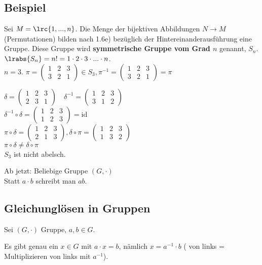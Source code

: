 	\subsection{Beispiel}

	Sei $M=\lrc{1,...,n}$. Die Menge der bijektiven Abbildungen $N\rightarrow M$ (Permutationen) bilden nach 1.6e) bezüglich der Hintereinanderausführung eine Gruppe. Diese Gruppe wird \textbf{symmetrische Gruppe vom Grad $n$} genannt, $S_n$.\\
	$\lrabs{S_n}=n!=1\cdot 2\cdot 3\cdot...\cdot n$.\\
	$n=3$. $\pi=\begin{pmatrix}1&2&3\\3&2&1\end{pmatrix}\in S_3,\pi^{-1}=\begin{pmatrix}1&2&3\\3&2&1\end{pmatrix}=\pi$

	$\delta=\begin{pmatrix}1&2&3\\2&3&1\end{pmatrix}
	\quad\delta^{-1}=
	\begin{pmatrix}1&2&3\\3&1&2\end{pmatrix}$\\
	$\delta^{-1}\circ\delta=
\begin{pmatrix}1&2&3\\1&2&3\end{pmatrix}=\mbox{id}$\\
	$\pi\circ\delta=\begin{pmatrix}1&2&3\\2&1&3\end{pmatrix},\delta\circ\pi=\begin{pmatrix}1&2&3\\1&3&2\end{pmatrix}$\\
	$\pi\circ\delta\neq\delta\circ\pi$\\
	$S_3$ ist nicht abelsch.

	Ab jetzt: Beliebige Gruppe $(G,\cdot)$\\
	Statt $a\cdot b$ schreibt man $ab$.

	\subsection{Gleichunglösen in Gruppen}

	Sei $(G,\cdot)$ Gruppe, $a,b\in G$.
		\item Es gibt genau ein $x\in G$ mit $a\cdot x=b$, nämlich $x=a^{-1}\cdot b$ ( von links = Multiplizieren von links mit $a^{-1}$).

